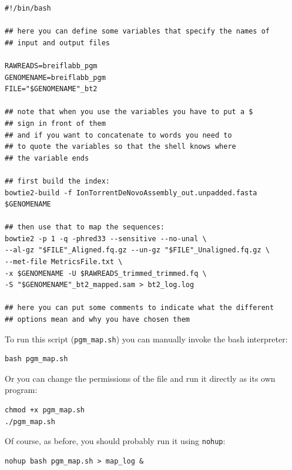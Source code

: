 \documentclass[11pt]{article}
\begin{document}
\begin{verbatim}
#!/bin/bash

## here you can define some variables that specify the names of
## input and output files

RAWREADS=breiflabb_pgm
GENOMENAME=breiflabb_pgm
FILE="$GENOMENAME"_bt2

## note that when you use the variables you have to put a $
## sign in front of them
## and if you want to concatenate to words you need to
## to quote the variables so that the shell knows where
## the variable ends

## first build the index:
bowtie2-build -f IonTorrentDeNovoAssembly_out.unpadded.fasta $GENOMENAME

## then use that to map the sequences:
bowtie2 -p 1 -q -phred33 --sensitive --no-unal \
--al-gz "$FILE"_Aligned.fq.gz --un-gz "$FILE"_Unaligned.fq.gz \
--met-file MetricsFile.txt \
-x $GENOMENAME -U $RAWREADS_trimmed_trimmed.fq \
-S "$GENOMENAME"_bt2_mapped.sam > bt2_log.log

## here you can put some comments to indicate what the different
## options mean and why you have chosen them
\end{verbatim}

To run this script (\texttt{pgm\_map.sh}) you can manually invoke the bash
interpreter:

\begin{verbatim}
bash pgm_map.sh
\end{verbatim}

Or you can change the permissions of the file and run it directly as its own program:

\begin{verbatim}
chmod +x pgm_map.sh
./pgm_map.sh
\end{verbatim}

Of course, as before, you should probably run it using \texttt{nohup}:

\begin{verbatim}
nohup bash pgm_map.sh > map_log &
\end{verbatim}
\end{document}
